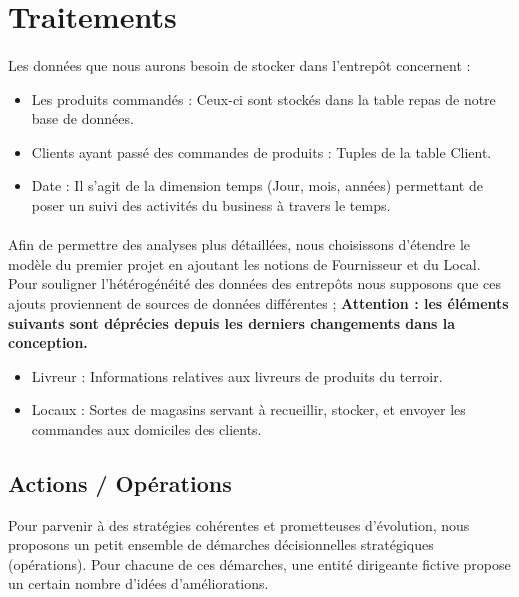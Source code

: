 \section{Traitements}

\paragraph{} Les données que nous aurons besoin de stocker dans l’entrepôt concernent : 

\begin{itemize}
    \item Les produits commandés : Ceux-ci sont stockés dans la table repas de notre base de données.
    \item Clients ayant passé des commandes de produits : Tuples de la table Client.
    \item Date : Il s’agit de la dimension temps (Jour, mois, années) permettant de poser un suivi des activités du business à travers le temps.
\end{itemize}

\paragraph{} Afin de permettre des analyses plus détaillées, nous choisissons d’étendre le modèle du premier projet en ajoutant les notions de Fournisseur et du Local. Pour souligner l’hétérogénéité des données des entrepôts nous supposons que ces ajouts proviennent de sources de données différentes ;
\newlinef
\textbf{Attention : les éléments suivants sont déprécies depuis les derniers changements dans la conception.}
\begin{itemize}
    \item Livreur : Informations relatives aux livreurs de produits du terroir.
    \item Locaux : Sortes de magasins servant à recueillir, stocker, et envoyer les commandes aux domiciles des clients.

\end{itemize}

\subsection{Actions / Opérations}
Pour parvenir à des stratégies cohérentes et prometteuses d’évolution, nous proposons un petit ensemble de démarches décisionnelles stratégiques (opérations). Pour chacune de ces démarches, une entité dirigeante fictive propose un certain nombre d’idées d’améliorations.


